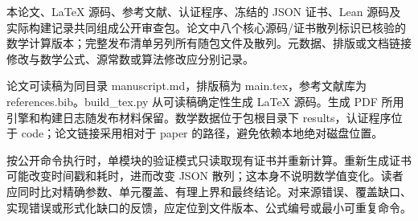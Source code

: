 \documentclass[UTF8,zihao=-4,fontset=fandol]{ctexart}
\begin{document}
本论文、LaTeX 源码、参考文献、认证程序、冻结的 JSON 证书、Lean 源码及实际构建记录共同组成公开审查包。论文中八个核心源码/证书散列标识已核验的数学计算版本；完整发布清单另列所有随包文件及散列。元数据、排版或文档链接修改与数学公式、源常数或算法修改应分别记录。

论文可读稿为同目录 manuscript.md，排版稿为 main.tex，参考文献库为 references.bib。build\_tex.py 从可读稿确定性生成 LaTeX 源码。生成 PDF 所用引擎和构建日志随发布材料保留。数学数据位于包根目录下 results，认证程序位于 code；论文链接采用相对于 paper 的路径，避免依赖本地绝对磁盘位置。

按公开命令执行时，单模块的验证模式只读取现有证书并重新计算。重新生成证书可能改变时间戳和耗时，进而改变 JSON 散列；这本身不说明数学值变化。读者应同时比对精确参数、单元覆盖、有理上界和最终结论。对来源错误、覆盖缺口、实现错误或形式化缺口的反馈，应定位到文件版本、公式编号或最小可重复命令。
\end{document}
